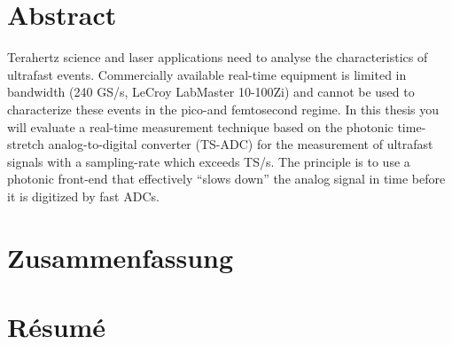 \chapter*{Abstract}

Terahertz science and laser applications need to analyse the characteristics of ultrafast events. Commercially available real-time equipment is limited in bandwidth (240 GS/s, LeCroy LabMaster 10-100Zi) and cannot be used to characterize these events in the pico-and femtosecond regime. In this thesis you will evaluate a real-time measurement technique based on the photonic time-stretch analog-to-digital converter (TS-ADC) for the measurement of ultrafast signals with a sampling-rate which exceeds TS/s. The principle is to use a photonic front-end that effectively “slows down” the analog signal in time before it is digitized by fast ADCs.



\chapter*{Zusammenfassung}
\chapter*{Résumé}